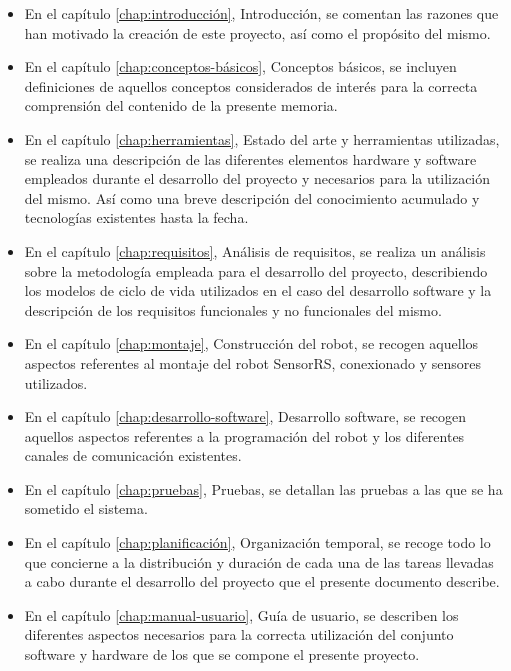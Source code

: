 \begin{itemize}

\item En el capítulo \ref{chap:introducción}, Introducción, se comentan las razones que han motivado la creación de este proyecto, así como el propósito del mismo.

\item En el capítulo \ref{chap:conceptos-básicos}, Conceptos básicos, se incluyen definiciones de aquellos conceptos considerados de interés para la correcta comprensión del contenido de la presente memoria.

\item En el capítulo \ref{chap:herramientas}, Estado del arte y herramientas utilizadas, se realiza una descripción de las diferentes elementos hardware y software empleados durante el desarrollo del proyecto y necesarios para la utilización del mismo. Así como una breve descripción del conocimiento acumulado y tecnologías existentes hasta la fecha.

\item En el capítulo \ref{chap:requisitos}, Análisis de requisitos, se realiza un análisis sobre la metodología empleada para el desarrollo del proyecto, describiendo
los modelos de ciclo de vida utilizados en el caso del desarrollo software y la descripción de los requisitos funcionales y no funcionales del mismo.

\item En el capítulo \ref{chap:montaje}, Construcción del robot, se recogen aquellos aspectos referentes al montaje del robot SensorRS, conexionado y sensores utilizados. 

\item En el capítulo \ref{chap:desarrollo-software}, Desarrollo software, se recogen aquellos aspectos referentes a la programación del robot y los diferentes canales de comunicación existentes.

\item En el capítulo \ref{chap:pruebas}, Pruebas, se detallan las pruebas a las que se ha sometido el sistema.

\item En el capítulo \ref{chap:planificación}, Organización temporal, se recoge todo lo que concierne a la distribución y duración de cada una de las tareas llevadas a cabo durante el desarrollo del proyecto que el presente documento describe.

\item En el capítulo \ref{chap:manual-usuario}, Guía de usuario, se describen los diferentes aspectos necesarios para la correcta utilización del conjunto software y hardware de los que se compone el presente proyecto.


\end{itemize}
